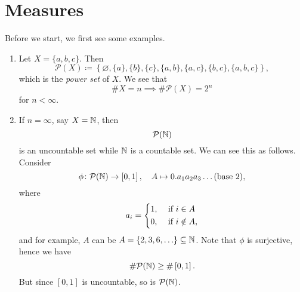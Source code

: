 \section{Measures}
\begin{eg}
	Before we start, we first see some examples.
	\begin{enumerate}
		\item Let \(X = \{a, b, c\}\). Then
		      \[
			      \mathcal{P}(X)\coloneqq \left\{\varnothing , \{a\}, \{b\}, \{c\}, \{a, b\}, \{a, c\}, \{b, c\}, \{a, b, c\}\right\},
		      \]
		      which is the \emph{power set} of \(X\). We see that
		      \[
			      \# X = n \implies \# \mathcal{P}(X) = 2^n
		      \]
		      for \(n< \infty\).
		\item If \(n = \infty\), say \(X = \mathbb{\MakeUppercase{N}} \), then
		      \[
			      \mathcal{P} (\mathbb{\MakeUppercase{N}} )
		      \]
		      is an uncountable set while \(\mathbb{\MakeUppercase{N}}\) is a countable set. We can see this as follows. Consider
		      \[
			      \phi\colon \mathcal{P}(\mathbb{\MakeUppercase{N}}) \to \left[0, 1\right],\quad A\mapsto 0.a_1 a_2 a_3 \ldots (\text{base }2),
		      \]
		      where
		      \[
			      a_i = \begin{dcases}
				      1, & \text{ if } i\in A     \\
				      0, & \text{ if } i\notin A,
			      \end{dcases}
		      \]
		      and for example, \(A\) can be
		      \(A = \{2, 3, 6, \ldots  \}\subseteq \mathbb{\MakeUppercase{N}}\). Note that \(\phi\) is surjective, hence we have
		      \[
			      \# \mathcal{P}(\mathbb{\MakeUppercase{N}} ) \geq \#\left[0, 1\right].
		      \]
		      But since \(\left[0, 1\right]\) is uncountable, so is \(\mathcal{P} (\mathbb{\MakeUppercase{N}} )\).
	\end{enumerate}
\end{eg}

